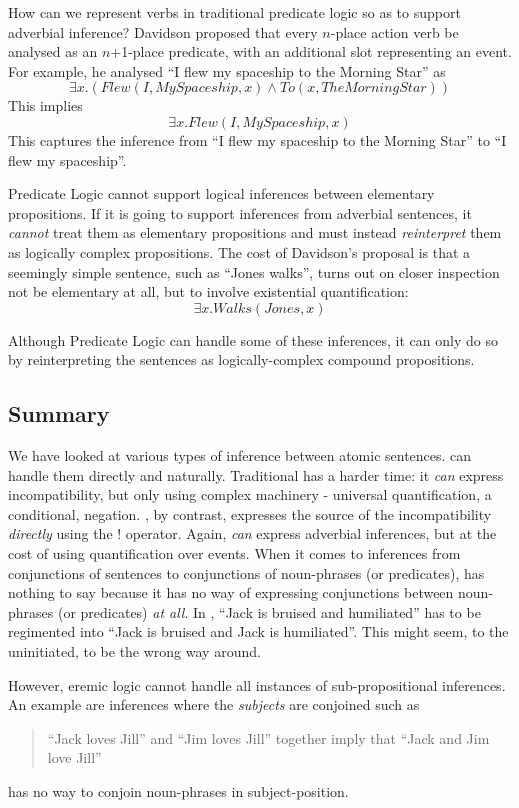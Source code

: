 \NI How can we represent verbs in traditional predicate logic so as to
support adverbial inference?  Davidson \cite{davidson2} proposed that
every $n$-place action verb be analysed as an $n$+1-place predicate,
with an additional slot representing an event.  For example, he
analysed ``I flew my spaceship to the Morning Star'' as
\[
\exists x. ( Flew(I, MySpaceship, x) \land To(x, TheMorningStar))
\]
This implies 
\[
\exists x.  Flew(I, MySpaceship, x)
\]
This captures the inference from ``I flew my spaceship to the Morning Star'' to ``I flew my spaceship''.

Predicate Logic cannot support logical inferences between elementary propositions. 
If it is going to support inferences from adverbial sentences, it \emph{cannot} treat them as elementary propositions and must instead \emph{reinterpret} them as logically complex propositions.
The cost of Davidson's proposal is that a seemingly simple sentence, such as ``Jones walks'', turns out on closer inspection not be elementary at all,  but to involve existential quantification:
\[
\exists x.  Walks(Jones, x)
\]

\NI Although Predicate Logic can handle some of these inferences, it
can only do so by reinterpreting the sentences as logically-complex
compound propositions.

\subsection{Summary}
We have looked at various types of inference between atomic
sentences. \ELFULL{} can handle them directly and naturally.  Traditional
\fol has a harder time: it
\emph{can} express incompatibility, but only using complex machinery -
universal quantification, a conditional, negation. \ELFULL{}, by
contrast, expresses the source of the incompatibility \emph{directly}
using the $!$ operator.  Again, \fol \emph{can} express
adverbial inferences, but at the cost of using quantification over
events.  When it comes to inferences from conjunctions of sentences to
conjunctions of noun-phrases (or predicates), \fol has
nothing to say because it has no way of expressing conjunctions
between noun-phrases (or predicates) \emph{at all}. In \fol, ``Jack is bruised and humiliated'' has to be regimented into
``Jack is bruised and Jack is humiliated''.  This might seem, to the uninitiated, to be the
wrong way around.  

However, eremic logic cannot handle all instances
of sub-propositional inferences.  An example are inferences where the
\emph{subjects} are conjoined such as
\begin{quote}
``Jack loves Jill'' and ``Jim loves Jill'' together imply that ``Jack and Jim love Jill''
\end{quote}

\NI \ELFULL{} has no way to conjoin noun-phrases in subject-position.
